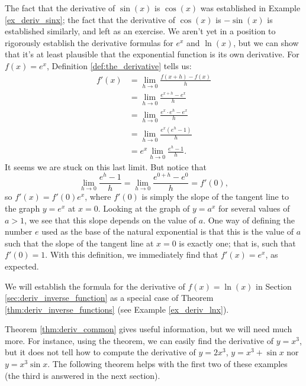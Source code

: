 The fact that the derivative of $\sin(x)$ is $\cos(x)$ was established in Example \ref{ex_deriv_sinx}; the fact that the derivative of $\cos(x)$ is $-\sin(x)$ is established similarly, and left as an exercise. We aren't yet in a position to rigorously establish the derivative formulas for $e^x$ and $\ln(x)$, but we can show that it's at least plausible that the exponential function is its own derivative. For $f(x)=e^x$, Definition \ref{def:the_derivative} tells us:
\begin{align*}
f'(x) & = \lim_{h\to 0}\frac{f(x+h)-f(x)}{h}\\
& = \lim_{h\to 0}\frac{e^{x+h}-e^x}{h}\\
& = \lim_{h\to 0}\frac{e^x\cdot e^h - e^x}{h} \tag{Laws of exponents}\\
& = \lim_{h\to 0}\frac{e^x(e^h-1)}{h} \tag{Factoring}\\
& = e^x\lim_{h\to 0}\frac{e^h-1}{h}.
\end{align*}
It seems we are stuck on this last limit. But notice that
\[
\lim_{h\to 0}\frac{e^h-1}{h} = \lim_{h\to 0}\frac{e^{0+h}-e^0}{h} = f'(0),
\]
so $f'(x) = f'(0)e^x$, where $f'(0)$ is simply the slope of the tangent line to the graph $y=e^x$ at $x=0$. Looking at the graph of $y=a^x$ for several values of $a>1$, we see that this slope depends on the value of $a$. One way of defining the number $e$ used as the base of the natural exponential is that this is the value of $a$ such that the slope of the tangent line at $x=0$ is exactly one; that is, such that $f'(0)=1$. With this definition, we immediately find that $f'(x)=e^x$, as expected.


We will establish the formula for the derivative of $f(x)=\ln(x)$ in Section \ref{sec:deriv_inverse_function} as a special case of Theorem \ref{thm:deriv_inverse_functions} (see Example \ref{ex_deriv_lnx}).


Theorem \ref{thm:deriv_common} gives useful information, but we will need much more. For instance, using the theorem, we can easily find the derivative of $y=x^3$, but it does not tell how to compute the derivative of $y=2x^3$, $y=x^3+\sin x$ nor $y=x^3\sin x$. The following theorem helps with the first two of these examples (the third is answered in the next section).
\enlargethispage{\baselineskip}

